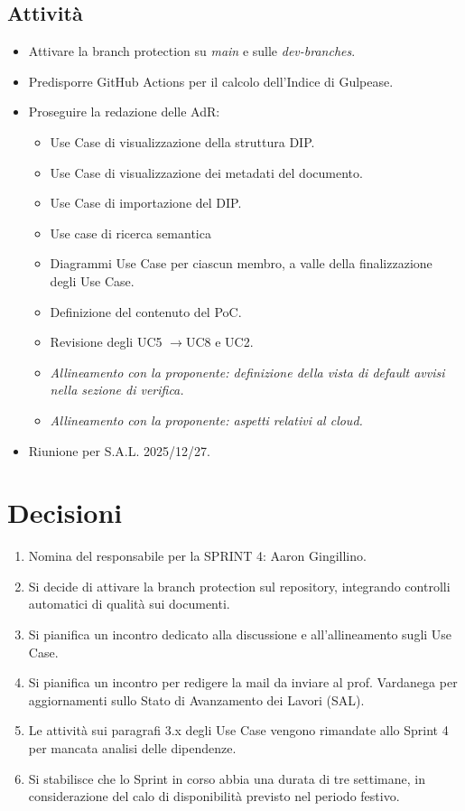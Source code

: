 \documentclass[a4paper,12pt]{article}
\begin{document}
\subsection{Attività}
\begin{itemize}[noitemsep]
    \item Attivare la branch protection su \textit{main} e sulle \textit{dev-branches}.
    \item Predisporre GitHub Actions per il calcolo dell'Indice di Gulpease.
    \item Proseguire la redazione delle AdR:
    \begin{itemize}[noitemsep]
        \item Use Case di visualizzazione della struttura DIP.
        \item Use Case di visualizzazione dei metadati del documento.
        \item Use Case di importazione del DIP.
        \item Use case di ricerca semantica
        \item Diagrammi Use Case per ciascun membro, a valle della finalizzazione degli Use Case.
        \item Definizione del contenuto del PoC.
        \item Revisione degli UC5 $\rightarrow$UC8 e UC2.
        \item \textit{Allineamento con la proponente: definizione della vista di default avvisi nella sezione di verifica.}
        \item \textit{Allineamento con la proponente: aspetti relativi al cloud.}
    \end{itemize}
    \item Riunione per S.A.L. 2025/12/27.
\end{itemize}

\section{Decisioni}
\begin{enumerate}[noitemsep]
    \item Nomina del responsabile per la SPRINT 4: Aaron Gingillino.
    \item Si decide di attivare la branch protection sul repository, integrando controlli automatici di qualità sui documenti.
    \item Si pianifica un incontro dedicato alla discussione e all'allineamento sugli Use Case.
    \item Si pianifica un incontro per redigere la mail da inviare al prof. Vardanega per aggiornamenti sullo Stato di Avanzamento dei Lavori (SAL).
    \item Le attività sui paragrafi 3.x degli Use Case vengono rimandate allo Sprint 4 per mancata analisi delle dipendenze.
    \item Si stabilisce che lo Sprint in corso abbia una durata di tre settimane, in considerazione del calo di disponibilità previsto nel periodo festivo.
\end{enumerate}
\end{document}

